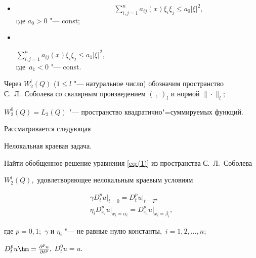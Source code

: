 \begin{itemize}  

\item[a)] \hypertarget{dzh:a}{}~~~~~~~~~~~~~~~~~~~~~~~~~~~ $\displaystyle \sum\limits_{i,j=1}^{n}  a_{ij} (x) \xi _i \xi _j \le

 {{a}_{0}}{{\left| \xi  \right|}^{2}},$ \\ где ${{a}_{0}}>0$ "--- const;



\item[б)] \hypertarget{dzh:b}{}~~~~~~~~~~~~~~~~~~~~~~~~~~~ 

$\displaystyle \sum\limits_{i,j=1}^{n}{{{a}_{ij} (x)} {{\xi }_{i}}{{\xi }_{j}}}\le {{a}_{1}}{{\left| \xi  \right|}^{2}},$ \\ где $\,{{a}_{1}}<0$ "--- const.





\end{itemize}





\noindent

Через $W_{2}^{l}(Q)$ ($1\le l$ "--- натуральное число) обозначим пространство С.~Л.~Соболева со скалярным произведением $({~ }, {~ })_l$ и нормой  $\|{} \cdot {}\|_l$; 

$W_{2}^{0}(Q)=L_2(Q)$ "--- пространство квадратично"=суммируемых функций.





\smallskip



Рассматривается следующая %



\smallskip



{\small\sc Нелокальная краевая задача.} {\it 

Найти обобщенное решение уравнения \eqref{eq:(1)} из пространства С$.$~Л$.$~Соболева

$W_{2}^{l}(Q),$ удовлетворяющее  нелокальным краевым условиям

\begin{gather}

\label{eq:(2)}

\gamma D_{t}^{p} u \bigr|_{t=0}=D_{t}^{p} u \bigr|_{t=T},

\\

\label{eq:(3)}

{{\eta }_{i}}D_{{{x}_{i}}}^{p} 

 u \bigr|_{x_i= \alpha _i}= D_{{{x}_{i}}}^{p} u \bigr|_{x_i=\beta _i},

\end{gather}

где $ p=0, 1;$ $\gamma$  и  $ \eta _{i} $ "--- не равные нулю константы$,$ $i=1, 2,\dots, n;$  

${D_{t}^{p}u\hm =\frac{\partial ^p u}{\partial t ^p}},$ $D_{t}^{0} u=u.$ }





